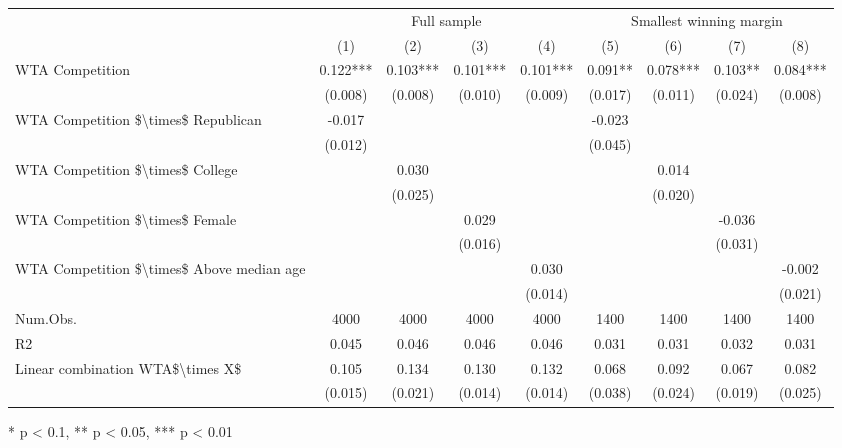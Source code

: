 \begin{table}[t]
\fontsize{12.0pt}{14.4pt}\selectfont
\begin{tabular*}{\linewidth}{@{\extracolsep{\fill}}lcccccccc}
\toprule
 & \multicolumn{4}{c}{Full sample} & \multicolumn{4}{c}{Smallest winning margin} \\ 
\cmidrule(lr){2-5} \cmidrule(lr){6-9}
  & (1) & (2) & (3) & (4) & (5) & (6) & (7) & (8) \\ 
\midrule\addlinespace[2.5pt]
WTA Competition & 0.122*** & 0.103*** & 0.101*** & 0.101*** & 0.091** & 0.078*** & 0.103** & 0.084*** \\ 
 & (0.008) & (0.008) & (0.010) & (0.009) & (0.017) & (0.011) & (0.024) & (0.008) \\ 
WTA Competition \$\textbackslash{}times\$ Republican & -0.017 &  &  &  & -0.023 &  &  &  \\ 
 & (0.012) &  &  &  & (0.045) &  &  &  \\ 
WTA Competition \$\textbackslash{}times\$ College &  & 0.030 &  &  &  & 0.014 &  &  \\ 
 &  & (0.025) &  &  &  & (0.020) &  &  \\ 
WTA Competition \$\textbackslash{}times\$ Female &  &  & 0.029 &  &  &  & -0.036 &  \\ 
 &  &  & (0.016) &  &  &  & (0.031) &  \\ 
WTA Competition \$\textbackslash{}times\$ Above median age &  &  &  & 0.030 &  &  &  & -0.002 \\ 
{} & {} & {} & {} & {(0.014)} & {} & {} & {} & {(0.021)} \\ 
Num.Obs. & 4000 & 4000 & 4000 & 4000 & 1400 & 1400 & 1400 & 1400 \\ 
R2 & 0.045 & 0.046 & 0.046 & 0.046 & 0.031 & 0.031 & 0.032 & 0.031 \\ 
Linear combination WTA\$\textbackslash{}times X\$ & 0.105 & 0.134 & 0.130 & 0.132 & 0.068 & 0.092 & 0.067 & 0.082 \\ 
 & (0.015) & (0.021) & (0.014) & (0.014) & (0.038) & (0.024) & (0.019) & (0.025) \\ 
\bottomrule
\end{tabular*}
\begin{minipage}{\linewidth}
* p < 0.1, ** p < 0.05, *** p < 0.01\\
\end{minipage}
\end{table}

